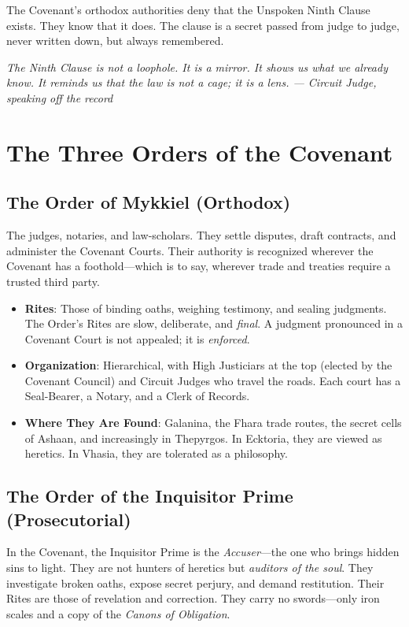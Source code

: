 \documentclass{book}
\newcommand{\citation}[1]{\textcolor{marginalia}{\small\textit{#1}}}
\begin{document}
The Covenant's orthodox authorities deny that the Unspoken Ninth Clause exists. They know that it does. The clause is a secret passed from judge to judge, never written down, but always remembered.

\citation{The Ninth Clause is not a loophole. It is a mirror. It shows us what we already know. It reminds us that the law is not a cage; it is a lens. --- Circuit Judge, speaking off the record}

\chapter{The Three Orders of the Covenant}

\section{The Order of Mykkiel (Orthodox)}

The judges, notaries, and law-scholars. They settle disputes, draft contracts, and administer the Covenant Courts. Their authority is recognized wherever the Covenant has a foothold---which is to say, wherever trade and treaties require a trusted third party.

\begin{itemize}
\item \textbf{Rites}: Those of binding oaths, weighing testimony, and sealing judgments. The Order's Rites are slow, deliberate, and \textit{final}. A judgment pronounced in a Covenant Court is not appealed; it is \textit{enforced}.
\item \textbf{Organization}: Hierarchical, with High Justiciars at the top (elected by the Covenant Council) and Circuit Judges who travel the roads. Each court has a Seal-Bearer, a Notary, and a Clerk of Records.
\item \textbf{Where They Are Found}: Galanina, the Fhara trade routes, the secret cells of Ashaan, and increasingly in Thepyrgos. In Ecktoria, they are viewed as heretics. In Vhasia, they are tolerated as a philosophy.
\end{itemize}

\section{The Order of the Inquisitor Prime (Prosecutorial)}

In the Covenant, the Inquisitor Prime is the \textit{Accuser}---the one who brings hidden sins to light. They are not hunters of heretics but \textit{auditors of the soul}. They investigate broken oaths, expose secret perjury, and demand restitution. Their Rites are those of revelation and correction. They carry no swords---only iron scales and a copy of the \textit{Canons of Obligation}.
\end{document}
